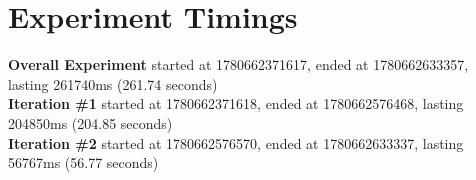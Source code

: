 \documentclass{article}
\begin{document}
\section*{Experiment Timings}
\textbf{Overall Experiment} started at 1780662371617, ended at 1780662633357, lasting 261740ms (261.74 seconds)
\\\textbf{Iteration \#1} started at 1780662371618, ended at 1780662576468, lasting 204850ms (204.85 seconds)
\\\textbf{Iteration \#2} started at 1780662576570, ended at 1780662633337, lasting 56767ms (56.77 seconds)
\end{document}

